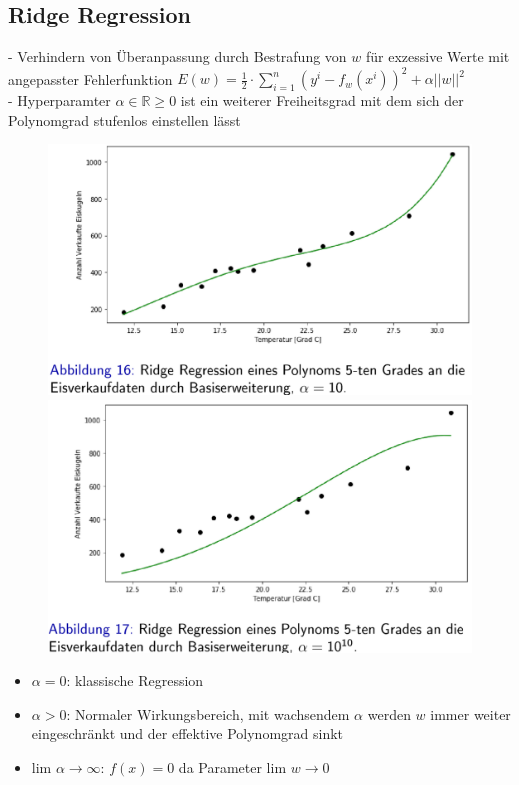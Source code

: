 \documentclass{report}
\begin{document}
  \subsection{Ridge Regression}	
  - Verhindern von Überanpassung durch Bestrafung von $w$ für exzessive Werte mit angepasster Fehlerfunktion	
  $E(w) = \frac{1}{2}\cdot \sum_{i=1}^n(y^i - f_w(x^i))^2 + \alpha ||w||^2$\\	
  - Hyperparamter $\alpha \in \mathbb{R} \geq 0$ ist ein weiterer Freiheitsgrad mit dem sich der Polynomgrad stufenlos einstellen lässt	
  \begin{figure}[H]	
    \centering	
    \begin{minipage}[b]{0.4\textwidth}	
      \includegraphics[scale=.215]{ml02_10}	
    \end{minipage}	
    \hfill	
    \begin{minipage}[b]{0.4\textwidth}	
      \includegraphics[scale=.215]{ml02_11}	
    \end{minipage}	
  \end{figure}	
  \begin{itemize}	
    \item $\alpha = 0$: klassische Regression	
    \item $\alpha > 0$: Normaler Wirkungsbereich, mit wachsendem $\alpha$ werden $w$ immer weiter eingeschränkt und der effektive Polynomgrad sinkt	
    \item lim $\alpha \rightarrow \infty$: $f(x) = 0$ da Parameter lim $w \rightarrow 0$	
  \end{itemize}	
  
\end{document}
